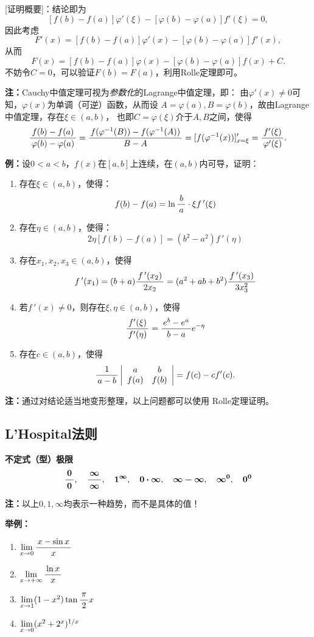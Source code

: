 [证明概要]：结论即为
$$[f(b)-f(a)]\varphi'(\xi)-[\varphi(b)-\varphi(a)]f'(\xi)=0,$$
因此考虑
$$F'(x)=[f(b)-f(a)]\varphi'(x)-[\varphi(b)-\varphi(a)]f'(x),$$
从而
$$F(x)=[f(b)-f(a)]\varphi(x)-[\varphi(b)-\varphi(a)]f(x)+C.$$
不妨令$C=0$，可以验证$F(b)=F(a)$，利用Rolle定理即可。

{\bf 注：}Cauchy中值定理可视为{\it 参数化}的Lagrange中值定理，即：
由$\varphi'(x)\ne 0$可知，$\varphi(x)$为单调（可逆）函数，从而设
$A=\varphi(a),B=\varphi(b)$，故由Lagrange中值定理，存在$\xi\in(a,b)$，
也即$C=\varphi(\xi)$介于$A,B$之间，使得
$$\displaystyle\frac{\,{f(b)-f(a)}\,}{\,{\varphi(b)-\varphi(a)}\,}
=\displaystyle\frac{\,{f(\varphi^{-1}(B))-f(\varphi^{-1}(A))}\,}{\,{B-A}\,}
=[f(\varphi^{-1}(x))]'_{x=\xi}=\displaystyle\frac{\,{f'(\xi)}\,}{\,{\varphi'(\xi)}\,}.$$

{\bf 例：}设$0<a<b$，$f(x)$在$[a,b]$上连续，在$(a,b)$内可导，证明：
\begin{enumerate}[(1)]
  \setlength{\itemindent}{1cm}
  \item 存在$\xi\in(a,b)$，使得：
	$$f(b)-f(a)=\ln\displaystyle\frac{\,{b}\,}{\,{a}\,}\cdot \xi f\,'(\xi)$$
  \item 存在$\eta\in(a,b)$，使得：
    $$2\eta[f(b)-f(a)]=(b^2-a^2)f\,'(\eta)$$
  \item 存在$x_1,x_2,x_3\in(a,b)$，使得
	$$f\,'(x_1)=(b+a)\displaystyle\frac{\,{f\,'(x_2)}\,}{\,{2x_2}\,}=(a^2+ab+b^2)
	\displaystyle\frac{\,{f\,'(x_3)}\,}{\,{3x_3^2}\,}$$ 
  \item 若$f\,'(x)\ne 0$，则存在$\xi,\eta\in(a,b)$，使得
	$$\displaystyle\frac{\,{f'(\xi)}\,}{\,{f'(\eta)}\,}=\displaystyle\frac{\,{e^b-e^a}\,}{\,{b-a}\,}e^{-\eta}$$
  \item 存在$c\in(a,b)$，使得
	$$\displaystyle\frac{\,{1}\,}{\,{a-b}\,}\left|\begin{array}{cc}
	a & b\\ f(a) & f(b)
	\end{array}\right|=f(c)-cf'(c).$$
\end{enumerate}

{\bf 注：}通过对结论适当地变形整理，以上问题都可以使用
Rolle定理证明。

\subsection{L'Hospital法则}

{\bf 不定式（型）极限}
$$\bm{\displaystyle\frac{\,{0}\,}{\,{0}\,}}, \quad \bm{\displaystyle\frac{\,{\infty}\,}{\,{\infty}\,}}, \quad
\bm{1^{\infty}}, \quad \bm{0\cdot\infty}, \quad
\bm{\infty-\infty}, \quad \bm{\infty^0}, \bm{\quad 0^0}$$

{\bf 注：}以上$0,1,\infty$均表示一种趋势，而不是具体的值！

{\bf 举例：}
\begin{enumerate}[(1)]
  \setlength{\itemindent}{1cm}
  \item $\lim\limits_{x\to{0}}\displaystyle\frac{\,{x-\sin x}\,}{\,{x}\,}$ 
  \item $\lim\limits_{x\to{+\infty}}\displaystyle\frac{\,{\ln x}\,}{\,{x}\,}$ 
  \item $\lim\limits_{x\to{1}}(1-x^2)\tan\displaystyle\frac{\,{\pi}\,}{\,{2}\,}x$ 
  \item $\lim\limits_{x\to{0}}(x^2+2^x)^{1/x}$
\end{enumerate}

